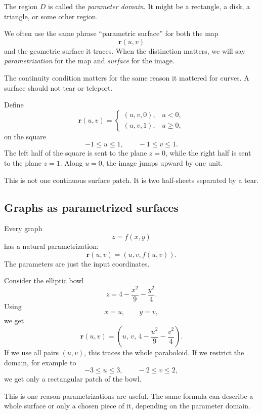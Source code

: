 The region \(D\) is called the \emph{parameter domain}.  It might be a rectangle, a
disk, a triangle, or some other region.

We often use the same phrase ``parametric surface'' for both the map
\[
    \mathbf r(u,v)
\]
and the geometric surface it traces.  When the distinction matters, we will say
\emph{parametrization} for the map and \emph{surface} for the image.

The continuity condition matters for the same reason it mattered for curves.  A surface
should not tear or teleport.

\begin{example}
Define
\[
    \mathbf r(u,v)=
    \begin{cases}
    (u,v,0), & u<0,\\
    (u,v,1), & u\ge0,
    \end{cases}
\]
on the square
\[
    -1\le u\le1,\qquad -1\le v\le1.
\]
The left half of the square is sent to the plane \(z=0\), while the right half is sent to
the plane \(z=1\).  Along \(u=0\), the image jumps upward by one unit.

This is not one continuous surface patch.  It is two half-sheets separated by a tear.
\end{example}

\subsection{Graphs as parametrized surfaces}

Every graph
\[
    z=f(x,y)
\]
has a natural parametrization:
\[
    \mathbf r(u,v)=(u,v,f(u,v)).
\]
The parameters are just the input coordinates.

\begin{example}
Consider the elliptic bowl
\[
    z=4-\frac{x^2}{9}-\frac{y^2}{4}.
\]
Using
\[
    x=u,\qquad y=v,
\]
we get
\[
    \mathbf r(u,v)
    =
    \left(
        u,\,
        v,\,
        4-\frac{u^2}{9}-\frac{v^2}{4}
    \right).
\]
If we use all pairs \((u,v)\), this traces the whole paraboloid.  If we restrict the
domain, for example to
\[
    -3\le u\le3,\qquad -2\le v\le2,
\]
we get only a rectangular patch of the bowl.
\end{example}

This is one reason parametrizations are useful.  The same formula can describe a whole
surface or only a chosen piece of it, depending on the parameter domain.


